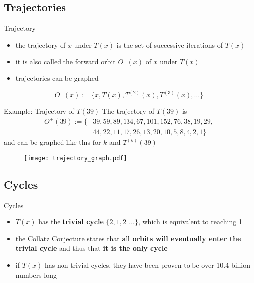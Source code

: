\documentclass[hyperref={colorlinks,allcolors=black}]{beamer}
\begin{document}
\subsection{Trajectories}


\begin{frame}{Trajectory}
\begin{itemize}
    \item the trajectory of $x$ under $T(x)$ is the set of successive
        iterations of $T(x)$
    \item it is also called the forward orbit $O^+(x)$ of $x$ under $T(x)$
    \item trajectories can be graphed 
\end{itemize}
\begin{equation}
    \nonumber
    O^+(x):=\{x, T(x), T^{(2)}(x), T^{(3)}(x),\dots\}
\end{equation}
\end{frame}


\begin{frame}{Example: Trajectory of $T(39)$}
The trajectory of $T(39)$ is
\begin{align}
    \nonumber
    O^+(39):=\{&39,59,89,134,67,101,152,76,38,19,29,\\
    \nonumber
               &44,22,11,17,26,13,20,10,5,8,4,2,1\}
\end{align}
and can be graphed like this for $k$ and $T^{(k)}(39)$
\begin{figure}
\texttt{[image: trajectory\_graph.pdf]}
\end{figure}
\end{frame}


\subsection{Cycles}


\begin{frame}{Cycles}
\begin{itemize}
    \item $T(x)$ has the \textbf{trivial cycle} $\{2,1,2,\dots\}$, which is
        equivalent to reaching 1
    \item the Collatz Conjecture states that \textbf{all orbits will 
        eventually enter the trivial cycle} and thus that \textbf{it is the 
        only cycle}
    \item if $T(x)$ has non-trivial cycles, they have been proven to be over
        10.4 billion numbers long
\end{itemize}
\end{frame}
\end{document}
